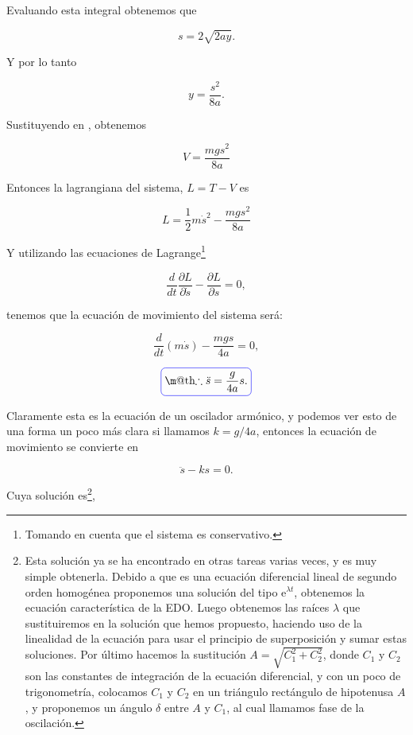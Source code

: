 \documentclass[a4paper,10pt]{article}
\makeatletter
\numberwithin{equation}{section}
\newcommand*{\boxcolor}{blue}
\renewcommand{\boxed}[1]{\textcolor{\boxcolor}{%
\tikz[baseline={([yshift=-1ex]current bounding box.center)}] \node [rectangle, minimum width=1ex,rounded corners,draw] {\normalcolor\m@th$\displaystyle#1$};}}
\newcommand{\euler}{\mathrm{e}}
\makeatother
\begin{document}
Evaluando esta integral obtenemos que 

\begin{equation}
 s = 2 \sqrt{2ay}.
\end{equation}

Y por lo tanto

\begin{equation}
 y = \frac{s^2}{8a}.
 \label{eq:yCiclo}
\end{equation}

Sustituyendo  en , obtenemos 

\begin{equation}
 V = \frac{mgs^2}{8a}
\end{equation}

Entonces la lagrangiana del sistema, $L = T - V$ es 

\begin{equation}
 L = \frac{1}{2} m \dot{s}^2 - \frac{mgs^2}{8a}
\end{equation}

Y utilizando las ecuaciones de Lagrange\footnote{Tomando en cuenta que el sistema es conservativo.} 


\begin{equation}
 \frac{d}{dt}\frac{\partial L}{\partial \dot{s}} - \frac{\partial L}{\partial s} = 0,
\end{equation}

tenemos que la ecuación de movimiento del sistema será:

\begin{equation}
 \frac{d}{dt} (m\dot{s}) - \frac{mgs}{4a} = 0,
\end{equation}

\begin{equation}
 \boxed{\therefore \ddot{s} = \frac{g}{4a} s.}
\end{equation}

Claramente esta es la ecuación de un oscilador armónico, y podemos ver esto de una 
forma un poco más clara si llamamos $k = g/4a$, entonces la ecuación de movimiento 
se convierte en

\begin{equation}
 \ddot{s} - ks = 0.
\end{equation}

Cuya solución es\footnote{Esta solución ya se ha encontrado en otras tareas 
varias veces, y es muy simple obtenerla. Debido a que es una ecuación diferencial lineal
de segundo orden homogénea proponemos una solución del tipo $\euler^{\lambda t}$, obtenemos la 
ecuación característica de la EDO. Luego obtenemos las raíces $\lambda$ que sustituiremos
en la solución que hemos propuesto, haciendo uso de la linealidad de la ecuación para 
usar el principio de superposición y sumar estas soluciones. Por último hacemos la 
sustitución $A = \sqrt{C_1^2+ C_2^2}$, donde $C_1$ y $C_2$ son las constantes de 
integración de la ecuación diferencial, y con un poco de trigonometría, colocamos 
$C_1$ y $C_2$ en un triángulo rectángulo de hipotenusa $A$, y proponemos un ángulo
$\delta$ entre $A$ y $C_1$, al cual llamamos fase de la oscilación.},
\end{document}
